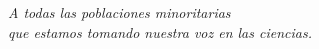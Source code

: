 \begin{flushright}
    \null{}
    \emph{A todas las poblaciones minoritarias\\que estamos tomando nuestra voz en las ciencias.}
    \null
\end{flushright}
\newpage

